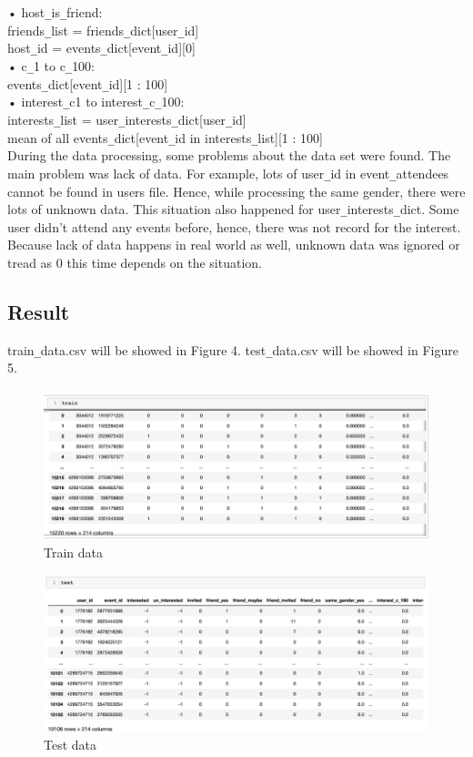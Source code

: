 \documentclass{article}
\begin{document}
•	host\verb+_+is\verb+_+friend: \\
	friends\verb+_+list = friends\verb+_+dict[user\verb+_+id]\\
	host\verb+_+id = events\verb+_+dict[event\verb+_+id][0]\\
•	c\verb+_+1 to c\verb+_+100:\\
	events\verb+_+dict[event\verb+_+id][1 : 100]\\
•	interest\verb+_+c1 to interest\verb+_+c\verb+_+100:\\
	interests\verb+_+list = user\verb+_+interests\verb+_+dict[user\verb+_+id]\\
	mean of all events\verb+_+dict[event\verb+_+id in interests\verb+_+list][1 : 100]\\
	
During the data processing, some problems about the data set were found. The main problem was lack of data. For example, lots of user\verb+_+id in event\verb+_+attendees cannot be found in users file. Hence, while processing the same gender, there were lots of unknown data. This situation also happened for user\verb+_+interests\verb+_+dict. Some user didn’t attend any events before, hence, there was not record for the interest. Because lack of data happens in real world as well, unknown data was ignored or tread as 0 this time depends on the situation.

\subsection{Result}

train\verb+_+data.csv will be showed in Figure 4. test\verb+_+data.csv will be showed in Figure 5.

\begin{figure}[h]
  \centering
  \includegraphics[width=1.0\textwidth]{img/Picture 3}
  \caption{Train data}
\end{figure}
\begin{figure}[h]
  \centering
  \includegraphics[width=1.0\textwidth]{img/Picture 4}
  \caption{Test data}
\end{figure}
\end{document}
